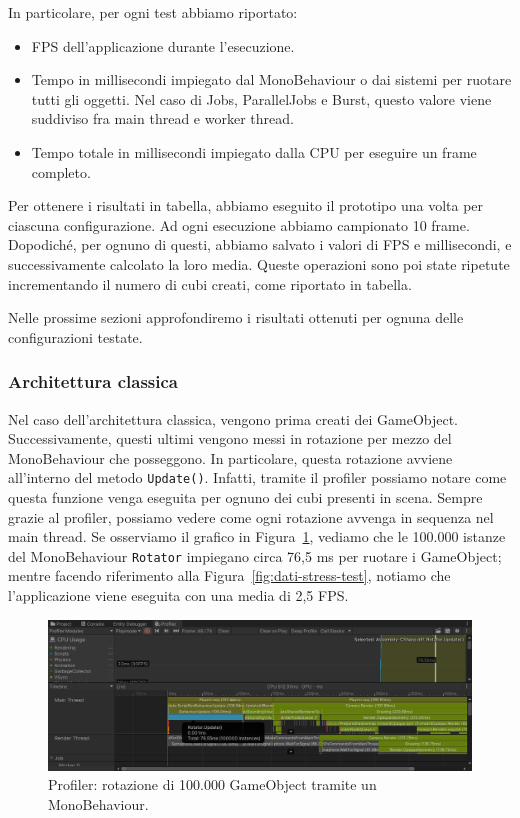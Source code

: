 In particolare, per ogni test abbiamo riportato:
\begin{itemize}
    \item FPS dell'applicazione durante l'esecuzione.
    \item Tempo in millisecondi impiegato dal MonoBehaviour o dai sistemi per ruotare tutti gli oggetti. Nel caso di Jobs, ParallelJobs e Burst, questo valore viene suddiviso fra main thread e worker thread.
    \item Tempo totale in millisecondi impiegato dalla CPU per eseguire un frame completo.
\end{itemize}

Per ottenere i risultati in tabella, abbiamo eseguito il prototipo una volta per ciascuna configurazione. Ad ogni esecuzione abbiamo campionato 10 frame. Dopodiché, per ognuno di questi, abbiamo salvato i valori di FPS e millisecondi, e successivamente calcolato la loro media. Queste operazioni sono poi state ripetute incrementando il numero di cubi creati, come riportato in tabella.

Nelle prossime sezioni approfondiremo i risultati ottenuti per ognuna delle configurazioni testate.

\subsubsection{Architettura classica}
Nel caso dell'architettura classica, vengono prima creati dei GameObject. Successivamente, questi ultimi vengono messi in rotazione per mezzo del MonoBehaviour che posseggono. In particolare, questa rotazione avviene all'interno del metodo \verb|Update()|. Infatti, tramite il profiler possiamo notare come questa funzione venga eseguita per ognuno dei cubi presenti in scena. Sempre grazie al profiler, possiamo vedere come ogni rotazione avvenga in sequenza nel main thread. Se osserviamo il grafico in Figura~\ref{fig:profiler-100k(1)}, vediamo che le 100.000 istanze del MonoBehaviour \verb|Rotator| impiegano circa 76,5 ms per ruotare i GameObject; mentre facendo riferimento alla Figura~\ref{fig:dati-stress-test}, notiamo che l'applicazione viene eseguita con una media di 2,5 FPS.

\begin{figure}[!ht]
    \centering
    \includegraphics[width=0.95\columnwidth]{gfx/imgs/chapter5/ProfilerStressTest100k(1).png}
    \caption{Profiler: rotazione di 100.000 GameObject tramite un MonoBehaviour.}
    \label{fig:profiler-100k(1)}
\end{figure}

